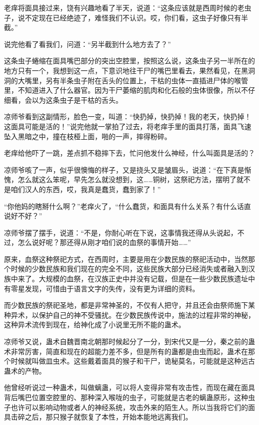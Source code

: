 老痒将面具接过来，饶有兴趣地看了半天，说道：“这条应该就是西周时候的老虫子，说不定现在已经绝迹了，难怪我们不认识。哎，你们看，这虫子好像只有半截。”

说完他看了看我们，问道：“另半截到什么地方去了？”

这条虫子蜷缩在面具嘴巴部分的突出空腔里，按照这么说，这条虫子另一半所在的地方只有一个，我想到这一点，下意识地往干尸的嘴巴里看去，果然看见，在黑洞洞的大嘴里，另有半条虫子附在舌头的位置上，干枯的虫体一直插进尸体的喉管里，不知道进入了什么器官。因为干尸萎缩的肌肉和化石般的虫体很像，所以不仔细看，会以为这条虫子是干枯的舌头。

凉师爷看到这副情形，脸色一变，叫道：“快扔掉，快扔掉！我的老天，快扔掉！这面具可能是活的！”说完他就一掌拍了过去，将老痒手里的面具打落，面具飞速坠入黑暗之中，撞在枝桠上面，啪的一声，摔得粉碎。

老痒给他吓了一跳，差点抓不稳摔下去，忙问他发什么神经，什么叫面具是活的？

凉师爷咳了一声，似乎很懊悔的样子，又是挠头又是皱眉头，说道：“在下真是惭愧，怎么就这么笨呢，早先怎么就没想到，这……铜树，这祭祀方法，摆明了就不是咱们汉人的东西，哎，我真是蠢货，蠢到家了！”

“你他妈的瞎掰什么啊？”老痒火了，“什么蠢货，和面具有什么关系？有什么话直说好不好？”

凉师爷摆了摆手，说道：“不是，你耐心听在下说，这事情我还得从头说起，不过，怎么说好呢？那还得从刚才咱们说的血祭的事情开始……”

原来，血祭这种祭祀方式，在西周时，主要是用在少数民族的祭祀活动中，当然那个时候的少数民族和我们现在的完全不同，这些民族大部分已经消失或者融入到汉族中来了。大规模的血祭，在汉族正史中并没有记载，但是在一些少数民族遗址中有零星发现，可惜由于语言文字的失传，没有更为详细的资料。

而少数民族的祭祀圣地，都是非常神圣的，不仅有人把守，并且还会由祭师施下某种异术，以保护自己的神不受骚扰。在少数民族传说中，施法的过程非常的神秘，这种异术流传到现在，给神化成了小说里无所不能的蛊术。

凉师爷又说，蛊术自魏晋南北朝那时候起分了一分，到宋代又是一分，秦之前的蛊术非常厉害，简直和现在的超能力差不多，但是所有的蛊都是由虫而起，蛊术在那个时候就叫做皿虫术。这些戴着面具的猴子和干尸，诡秘莫名，可能就是这种远古蛊术的产物。

他曾经听说过一种蛊术，叫做螭蛊，可以将人变得非常有攻击性，而现在藏在面具背后嘴巴位置空腔里的、那种深入喉咙的虫子，可能就是古老的螭蛊原形，这种虫子也许可以影响动物或者人的神经系统，攻击外来的陌生人。所以当我将它们的面具击碎之后，那只猴子就恢复了本性，开始本能地远离我们。


